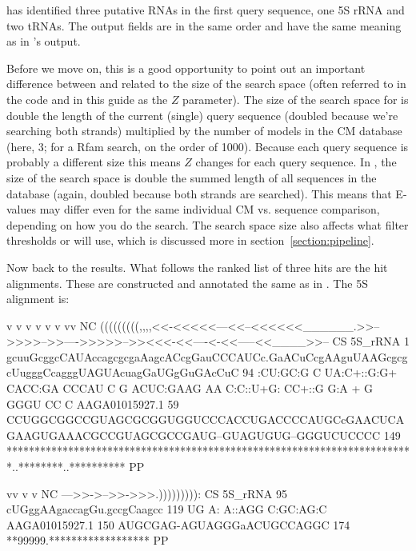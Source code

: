  has identified three putative RNAs in the first query
sequence, one 5S rRNA and two tRNAs. The output fields are in the
same order and have the same meaning as in 's output.

Before we move on, this is a good opportunity to point out an
important difference between  and  related
to the size of the search space (often referred to in the code and in
this guide as the $Z$ parameter).  The size of the search space for
 is double the length of the current (single) query
sequence (doubled because we're searching both strands) multiplied by
the number of models in the CM database (here, 3; for a Rfam search,
on the order of 1000). Because each query sequence is probably a
different size this means $Z$ changes for each query sequence. In
, the size of the search space is double the summed
length of all sequences in the database (again, doubled because both
strands are searched). This means that E-values may differ even for
the same individual CM vs. sequence comparison, depending on how you
do the search. The search space size also affects what filter
thresholds  or  will use, which is
discussed more in section~\ref{section:pipeline}.

Now back to the  results. What follows the ranked list of
three hits are the hit alignments. These are constructed and annotated
the same as in . The 5S alignment is:

\begin{widesreoutput}
                             v               v       v         v         v             v           vv                NC
                     (((((((((,,,,<<-<<<<<---<<--<<<<<<______.>>-->>>>-->>---->>>>>-->><<<-<<----<-<<-----<<____>>-- CS
         5S_rRNA   1 gcuuGcggcCAUAccagcgcgaAagcACcgGauCCCAUCc.GaACuCcgAAguUAAGcgcgcUugggCcagggUAGUAcuagGaUGgGuGAcCuC 94 
                     :CU:GC:G C UA:C+::G:G+   CACC:GA CCCAU C G ACUC:GAAG  AA C:C::U+G: CC+::G  G:A  + G  GGGU  CC C
  AAGA01015927.1  59 CCUGGCGGCCGUAGCGCGGUGGUCCCACCUGACCCCAUGCcGAACUCAGAAGUGAAACGCCGUAGCGCCGAUG--GUAGUGUG--GGGUCUCCCC 149
                     *************************************************************************..********..********** PP

                        vv         v v          NC
                     --->>->-->>->>>.))))))))): CS
         5S_rRNA  95 cUGggAAgaccagGu.gccgCaagcc 119
                      UG  A: A::AGG   C:GC:AG:C
  AAGA01015927.1 150 AUGCGAG-AGUAGGGaACUGCCAGGC 174
                     **99999.****************** PP
\end{widesreoutput}

